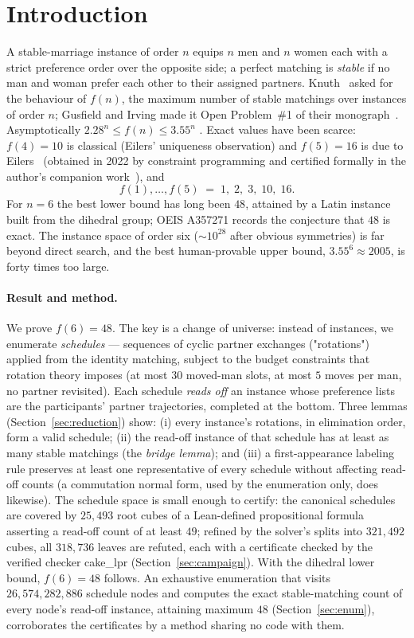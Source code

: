 \documentclass[11pt]{article}
\begin{document}
\section{Introduction}

A stable-marriage instance of order $n$ equips $n$ men and $n$ women each with a strict preference
order over the opposite side; a perfect matching is \emph{stable} if no man and woman prefer each
other to their assigned partners. Knuth~\cite{knuth} asked for the behaviour of $f(n)$, the maximum
number of stable matchings over instances of order $n$; Gusfield and Irving made it Open
Problem~\#1 of their monograph~\cite{gi89}. Asymptotically $2.28^n\le f(n)\le 3.55^n$
\cite{thurber,kow,pp}. Exact values have been scarce: $f(4)=10$ is classical (Eilers'
uniqueness observation) and $f(5)=16$ is due to Eilers~\cite{oeis} (obtained in 2022 by constraint
programming and certified formally in the author's companion work~\cite{f5paper}), and
\[
f(1),\dots,f(5) \;=\; 1,\;2,\;3,\;10,\;16.
\]
For $n=6$ the best lower bound has long been $48$, attained by a Latin instance built from the
dihedral group; OEIS A357271 records the conjecture that $48$ is exact. The instance space of
order six ($\sim\!10^{28}$ after obvious symmetries) is far beyond direct search, and the best
human-provable upper bound, $3.55^6\approx 2005$, is forty times too large.

\paragraph{Result and method.} We prove $f(6)=48$. The key is a change of universe: instead of
instances, we enumerate \emph{schedules} --- sequences of cyclic partner exchanges ("rotations")
applied from the identity matching, subject to the budget constraints that rotation theory imposes
(at most $30$ moved-man slots, at most $5$ moves per man, no partner revisited). Each schedule
\emph{reads off} an instance whose preference lists are the participants' partner trajectories,
completed at the bottom. Three lemmas (Section~\ref{sec:reduction}) show:
(i) every instance's rotations, in elimination order, form a valid schedule;
(ii) the read-off instance of that schedule has at least as many stable matchings
(the \emph{bridge lemma}); and
(iii) a first-appearance labeling rule preserves at least one representative of every schedule
without affecting read-off counts (a commutation normal form, used by the enumeration only, does
likewise).
The schedule space is small enough to certify: the canonical schedules are covered by $25{,}493$
root cubes of a Lean-defined propositional formula asserting a read-off count of at least $49$;
refined by the solver's splits into $321{,}492$ cubes, all $318{,}736$ leaves are refuted, each
with a certificate checked by the verified checker cake\_lpr (Section~\ref{sec:campaign}). With the
dihedral lower bound, $f(6)=48$ follows. An exhaustive enumeration that visits
$26{,}574{,}282{,}886$ schedule nodes and computes the exact stable-matching count of every node's
read-off instance, attaining maximum $48$ (Section~\ref{sec:enum}), corroborates the certificates
by a method sharing no code with them.
\end{document}
